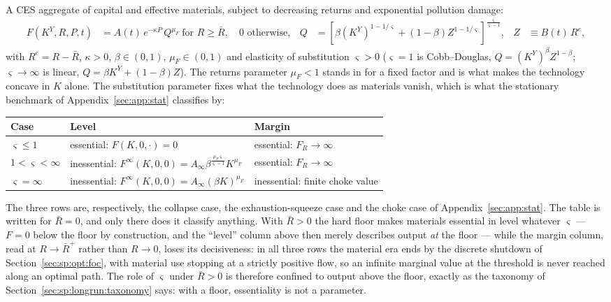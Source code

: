  A CES aggregate of capital and effective materials, subject to decreasing returns and exponential pollution damage:
\begin{align}
F\left(K^Y,R,P,t\right) &= A(t)\,e^{-\kappa P}\,Q^{\mu_F}\ \text{for }R\ge\bar R,\quad 0\text{ otherwise},
&
Q &= \left[\beta\left(K^Y\right)^{1-1/\varsigma}+\left(1-\beta\right)Z^{1-1/\varsigma}\right]^{\frac{\varsigma}{\varsigma-1}},
&
Z &\equiv B(t)\,R^{e},
\label{eq:app:wh:F}
\end{align}
with $R^e=R-\bar R$, $\kappa>0$, $\beta\in\left(0,1\right)$, $\mu_F\in\left(0,1\right)$ and elasticity of substitution $\varsigma>0$ ($\varsigma=1$ is Cobb--Douglas, $Q=\left(K^Y\right)^{\beta}Z^{1-\beta}$; $\varsigma\to\infty$ is linear, $Q=\beta K^Y+\left(1-\beta\right)Z$). The returns parameter $\mu_F<1$ stands in for a fixed factor and is what makes the technology concave in $K$ alone. The substitution parameter fixes what the technology does as materials vanish, which is what the stationary benchmark of Appendix~\ref{sec:app:stat} classifies by:
\begin{center}
\begin{tabular}{lll}
\toprule
Case & Level & Margin \\
\midrule
$\varsigma\le1$ & essential: $F\left(K,0,\cdot\right)=0$ & essential: $F_R\to\infty$ \\
$1<\varsigma<\infty$ & inessential: $F^\infty\left(K,0,0\right)=A_\infty\beta^{\frac{\mu_F\varsigma}{\varsigma-1}}K^{\mu_F}$ & essential: $F_R\to\infty$ \\
$\varsigma=\infty$ & inessential: $F^\infty\left(K,0,0\right)=A_\infty\left(\beta K\right)^{\mu_F}$ & inessential: finite choke value \\
\bottomrule
\end{tabular}
\end{center}
The three rows are, respectively, the collapse case, the exhaustion-squeeze case and the choke case of Appendix~\ref{sec:app:stat}. The table is written for $\bar R=0$, and only there does it classify anything. With $\bar R>0$ the hard floor makes materials essential in level whatever $\varsigma$ --- $F=0$ below the floor by construction, and the ``level'' column above then merely describes output \emph{at} the floor --- while the margin column, read at $R\to\bar R^{+}$ rather than $R\to0$, loses its decisiveness: in all three rows the material era ends by the discrete shutdown of Section~\ref{sec:sp:opt:foc}, with material use stopping at a strictly positive flow, so an infinite marginal value at the threshold is never reached along an optimal path. The role of $\varsigma$ under $\bar R>0$ is therefore confined to output above the floor, exactly as the taxonomy of Section~\ref{sec:sp:longrun:taxonomy} says: with a floor, essentiality is not a parameter.

